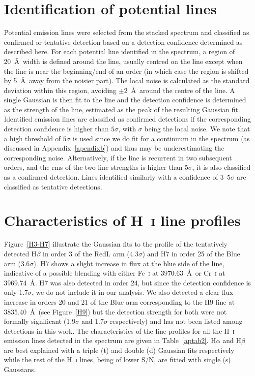 \documentclass{aa}
\newcommand{\Ha}{\ensuremath{\mathrm{H}\alpha}\xspace}
\newcommand{\Hb}{\ensuremath{\mathrm{H}\beta}\xspace}
\newcommand{\Hi}{H~\textsc{i}\xspace}
\begin{document}
\begin{appendix}
\section{Identification of potential lines}\label{apendixc}
Potential emission lines were selected from the stacked spectrum and classified as confirmed or tentative detection based on a detection confidence determined as described here. For each potential line identified in the spectrum, a region of 20~\AA\ width is defined around the line, usually centred on the line except when the line is near the beginning/end of an order (in which case the region is shifted by 5~\AA\ away from the noisier part). The local noise is calculated as the standard deviation within this region, avoiding $\pm2$~\AA\ around the centre of the line. A single Gaussian is then fit to the line and the detection confidence is determined as the strength of the line, estimated as the peak of the resulting Gaussian fit. Identified emission lines are classified as confirmed detections if the corresponding detection confidence is higher than $5\sigma$, with $\sigma$ being the local noise. We note that a high threshold of $5\sigma$ is used since we do fit for a continuum in the spectrum (as discussed in Appendix~\ref{apendixb}) and thus may be underestimating the corresponding noise. Alternatively, if the line is recurrent in two subsequent orders, and the rms of the two line strengths is higher than $5\sigma$, it is also classified as a confirmed detection. Lines identified similarly with a confidence of 3--$5\sigma$ are classified as tentative detections. 


\section{Characteristics of \Hi line profiles} \label{HIchar}
Figure~\ref{H3-H7}
illustrate the Gaussian fits to the profile of the tentatively detected H$\beta$ in order 3 of the RedL arm ($4.3\sigma$) and H7 in order 25 of the Blue arm ($3.6\sigma$). H7 shows a slight increase in flux at the blue side of the line, indicative of a possible blending with either Fe~\textsc{i} at 3970.63~\AA\ or Cr~\textsc{i} at 3969.74~\AA. H7 was also detected in order 24, but since the detection confidence is only $1.7\sigma$, we do not include it in our analysis. We also detected a clear flux increase in orders 20 and 21 of the Blue arm corresponding to the H9 line at 3835.40~\AA\ (see Figure~\ref{H9}) but the detection strength for both were not formally significant ($1.9\sigma$ and $1.7\sigma$ respectively) and has not been listed among detections in this work.
The characteristics of the line profiles for all the \Hi emission lines detected in the spectrum are given in Table~\ref{aptab2}. \Ha and \Hb are best explained with a triple (t) and double (d) Gaussian fits respectively while the rest of the \Hi lines, being of lower S/N, are fitted with single (s) Gaussians.


\end{appendix}
\end{document}
